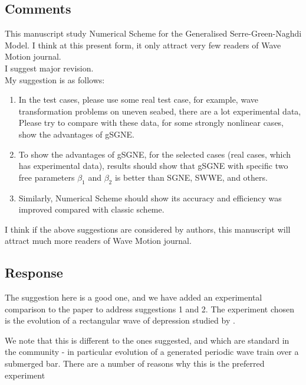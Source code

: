 \documentclass[10pt]{article}
\begin{document}
\subsection{Comments}
This manuscript study Numerical Scheme for the Generalised Serre-Green-Naghdi Model. I think at this present form, it only attract very few readers of Wave Motion journal.
\\
I suggest major revision.
\\
My suggestion is as follows:
\begin{enumerate}
	\item In the test cases, please use some real test case, for example, wave transformation problems on uneven seabed, there are a lot experimental data,
	Please try to compare with these data, for some strongly nonlinear cases, show the advantages of gSGNE.
	
	\item
	To show the advantages of gSGNE, for the selected cases (real cases, which has experimental data), results should show that
	gSGNE with specific two free parameters $\beta_1$ and $\beta_2$ is better than SGNE, SWWE, and others.
	
	\item  Similarly, Numerical Scheme should show its accuracy and efficiency was improved compared with classic scheme.
	
	
\end{enumerate}
I think if the above suggestions are considered by authors, this manuscript will attract much more readers of Wave Motion journal.

\subsection{Response}
The suggestion here is a good one, and we have added an experimental comparison to the paper to address suggestions 1 and 2. The experiment chosen is the evolution of a rectangular wave of depression studied by \citet{Hammack-Segur-1978-337}.

We note that this is different to the ones suggested, and which are standard in the community - in particular evolution of a generated periodic wave train over a submerged bar. There are a number of reasons why this is the preferred experiment
\end{document}
